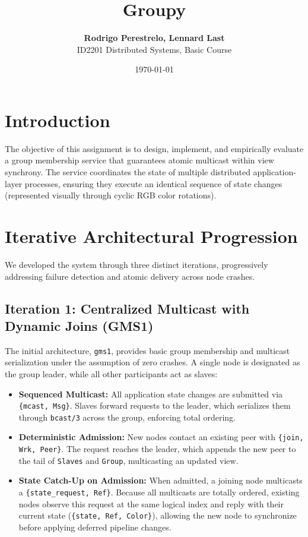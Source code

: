 \documentclass[a4paper, 11pt]{article}
\title{\textbf{Groupy}}
\author{\textbf{Rodrigo Perestrelo, Lennard Last} \\ ID2201 Distributed Systems, Basic Course}
\date{\today{}}
\begin{document}
\maketitle

\section{Introduction}

The objective of this assignment is to design, implement, and empirically evaluate a group membership service that guarantees atomic multicast within view synchrony. The service coordinates the state of multiple distributed application-layer processes, ensuring they execute an identical sequence of state changes (represented visually through cyclic RGB color rotations).

\section{Iterative Architectural Progression}

We developed the system through three distinct iterations, progressively addressing failure detection and atomic delivery across node crashes.

\subsection{Iteration 1: Centralized Multicast with Dynamic Joins (GMS1)}
The initial architecture, \texttt{gms1}, provides basic group membership and multicast serialization under the assumption of zero crashes. A single node is designated as the group leader, while all other participants act as slaves:
\begin{itemize}
    \item \textbf{Sequenced Multicast:} All application state changes are submitted via \texttt{\{mcast, Msg\}}. Slaves forward requests to the leader, which serializes them through \texttt{bcast/3} across the group, enforcing total ordering.
    \item \textbf{Deterministic Admission:} New nodes contact an existing peer with \texttt{\{join, Wrk, Peer\}}. The request reaches the leader, which appends the new peer to the tail of \texttt{Slaves} and \texttt{Group}, multicasting an updated view.
    \item \textbf{State Catch-Up on Admission:} When admitted, a joining node multicasts a \texttt{\{state\_request, Ref\}}. Because all multicasts are totally ordered, existing nodes observe this request at the same logical index and reply with their current state (\texttt{\{state, Ref, Color\}}), allowing the new node to synchronize before applying deferred pipeline changes.
\end{itemize}
\end{document}
